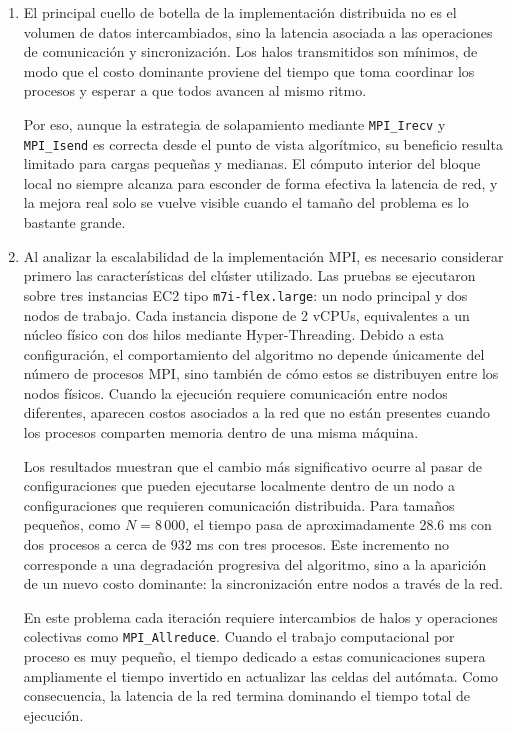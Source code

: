 \begin{enumerate}
\item

El principal cuello de botella de la implementación distribuida no es el volumen de datos intercambiados, sino la latencia asociada a las operaciones de comunicación y sincronización. Los halos transmitidos son mínimos, de modo que el costo dominante proviene del tiempo que toma coordinar los procesos y esperar a que todos avancen al mismo ritmo.

Por eso, aunque la estrategia de solapamiento mediante \texttt{MPI\_Irecv} y \texttt{MPI\_Isend} es correcta desde el punto de vista algorítmico, su beneficio resulta limitado para cargas pequeñas y medianas. El cómputo interior del bloque local no siempre alcanza para esconder de forma efectiva la latencia de red, y la mejora real solo se vuelve visible cuando el tamaño del problema es lo bastante grande.

\item

Al analizar la escalabilidad de la implementación MPI, es necesario considerar primero las características del clúster utilizado. Las pruebas se ejecutaron sobre tres instancias EC2 tipo \texttt{m7i-flex.large}: un nodo principal y dos nodos de trabajo. Cada instancia dispone de 2 vCPUs, equivalentes a un núcleo físico con dos hilos mediante Hyper-Threading. Debido a esta configuración, el comportamiento del algoritmo no depende únicamente del número de procesos MPI, sino también de cómo estos se distribuyen entre los nodos físicos. Cuando la ejecución requiere comunicación entre nodos diferentes, aparecen costos asociados a la red que no están presentes cuando los procesos comparten memoria dentro de una misma máquina.

Los resultados muestran que el cambio más significativo ocurre al pasar de configuraciones que pueden ejecutarse localmente dentro de un nodo a configuraciones que requieren comunicación distribuida. Para tamaños pequeños, como $N=8\,000$, el tiempo pasa de aproximadamente 28.6 ms con dos procesos a cerca de 932 ms con tres procesos. Este incremento no corresponde a una degradación progresiva del algoritmo, sino a la aparición de un nuevo costo dominante: la sincronización entre nodos a través de la red.

En este problema cada iteración requiere intercambios de halos y operaciones colectivas como \texttt{MPI\_Allreduce}. Cuando el trabajo computacional por proceso es muy pequeño, el tiempo dedicado a estas comunicaciones supera ampliamente el tiempo invertido en actualizar las celdas del autómata. Como consecuencia, la latencia de la red termina dominando el tiempo total de ejecución.


\end{enumerate}
